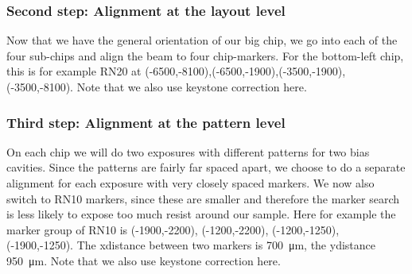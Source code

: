 \subsubsection{Second step: Alignment at the layout level}
Now that we have the general orientation of our big chip, we go into each of the four sub-chips and align the beam to four chip-markers. For the bottom-left chip, this is for example RN20 at (-6500,-8100),(-6500,-1900),(-3500,-1900),(-3500,-8100). Note that we also use keystone correction here.

\subsubsection{Third step: Alignment at the pattern level}
On each chip we will do two exposures with different patterns for two bias cavities. Since the patterns are fairly far spaced apart, we choose to do a separate alignment for each exposure with very closely spaced markers. We now also switch to RN10 markers, since these are smaller and therefore the marker search is less likely to expose too much resist around our sample. Here for example the marker group of RN10 is (-1900,-2200), (-1200,-2200), (-1200,-1250), (-1900,-1250). The xdistance between two markers is \SI{700}{\micro\meter}, the ydistance \SI{950}{\micro\meter}. Note that we also use keystone correction here.


